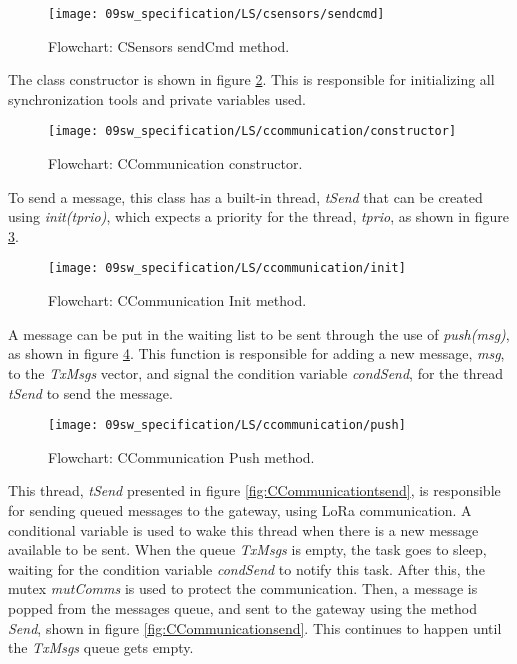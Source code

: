 \begin{figure}[H]
	\centering
	\texttt{[image: 09sw\_specification/LS/csensors/sendcmd]}
	\caption{Flowchart: CSensors sendCmd method.}
	\label{fig:CSensorssendcmd}
\end{figure}

\clearpage
{}

The class constructor is shown in figure \ref{fig:CCommunicationConstructor}. This is responsible for initializing all synchronization tools and private variables used.

\begin{figure}[H]
	\centering
	\texttt{[image: 09sw\_specification/LS/ccommunication/constructor]}
	\caption{Flowchart: CCommunication constructor.}
	\label{fig:CCommunicationConstructor}
\end{figure}

To send a message, this class has a built-in thread, \textit{tSend} that can be created using \textit{init(tprio)}, which expects a priority for the thread, \textit{tprio}, as shown in figure \ref{fig:CCommunicationinit}.

\begin{figure}[H]
	\centering
	\texttt{[image: 09sw\_specification/LS/ccommunication/init]}
	\caption{Flowchart: CCommunication Init method.}
	\label{fig:CCommunicationinit}
\end{figure}

A message can be put in the waiting list to be sent through the use of \textit{push(msg)}, as shown in figure \ref{fig:CCommunicationPush}. This function is responsible for adding a new message, \textit{msg}, to the \textit{TxMsgs} vector, and signal the condition variable \textit{condSend}, for the thread \textit{tSend} to send the message.

\begin{figure}[H]
	\centering
	\texttt{[image: 09sw\_specification/LS/ccommunication/push]}
	\caption{Flowchart: CCommunication Push method.}
	\label{fig:CCommunicationPush}
\end{figure}

\clearpage
This thread, \textit{tSend} presented in figure \ref{fig:CCommunicationtsend}, is responsible for sending queued messages to the gateway, using LoRa communication. A conditional variable is used to wake this thread when there is a new message available to be sent. When the queue \textit{TxMsgs} is empty, the task goes to sleep, waiting for the condition variable \textit{condSend} to notify this task. After this, the mutex \textit{mutComms} is used to protect the communication. Then, a message is popped from the messages queue, and sent to the gateway using the method \textit{Send}, shown in figure \ref{fig:CCommunicationsend}. This continues to happen until the \textit{TxMsgs} queue gets empty.

